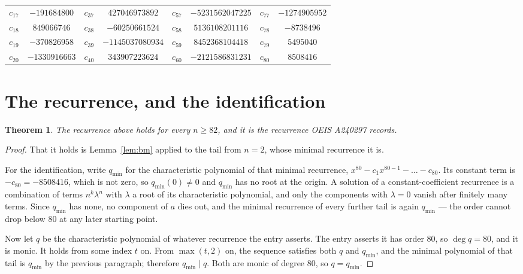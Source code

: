 \documentclass[11pt,a4paper]{article}
\theoremstyle{plain}
\newtheorem{theorem}{Theorem}
\theoremstyle{definition}
\begin{document}
\begin{center}
\begin{tabular}{cccccccc}
$c_{17}$ & $-191684800$ & $c_{37}$ & $427046973892$ & $c_{57}$ & $-5231562047225$ & $c_{77}$ & $-1274905952$ \\
$c_{18}$ & $849066746$ & $c_{38}$ & $-60250661524$ & $c_{58}$ & $5136108201116$ & $c_{78}$ & $-8738496$ \\
$c_{19}$ & $-370826958$ & $c_{39}$ & $-1145037080934$ & $c_{59}$ & $8452368104418$ & $c_{79}$ & $5495040$ \\
$c_{20}$ & $-1330916663$ & $c_{40}$ & $343907223624$ & $c_{60}$ & $-2121586831231$ & $c_{80}$ & $8508416$ \\
\end{tabular}
\end{center}

\section{The recurrence, and the identification}

\begin{theorem}
The recurrence above holds for every $n\ge82$, and it is the recurrence OEIS A240297 records.
\end{theorem}

\begin{proof}
That it holds is Lemma~\ref{lem:bm} applied to the tail from $n=2$, whose minimal
recurrence it is.

For the identification, write $q_{\min}$ for the characteristic polynomial of that minimal
recurrence, $x^{80}-c_1x^{80-1}-\dots-c_{80}$. Its constant term is
$-c_{80}=-8508416$, which is not zero, so $q_{\min}(0)\neq0$ and $q_{\min}$ has no
root at the origin. A solution of a constant-coefficient recurrence is a combination of terms
$n^{k}\lambda^{n}$ with $\lambda$ a root of its characteristic polynomial, and only the
components with $\lambda=0$ vanish after finitely many terms. Since $q_{\min}$ has none, no
component of $a$ dies out, and the minimal recurrence of every further tail is again
$q_{\min}$ --- the order cannot drop below $80$ at any later starting point.

Now let $q$ be the characteristic polynomial of whatever recurrence the entry asserts. The
entry asserts it has order $80$, so $\deg q=80$, and it is monic. It holds from some
index $t$ on. From $\max(t,2)$ on, the sequence satisfies both $q$ and $q_{\min}$, and
the minimal polynomial of that tail is $q_{\min}$ by the previous paragraph; therefore
$q_{\min}\mid q$. Both are monic of degree $80$, so $q=q_{\min}$.
\end{proof}
\end{document}
